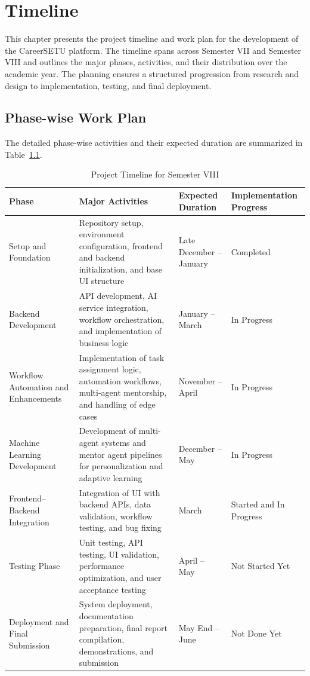 \documentclass[12pt,a4paper]{report}
\begin{document}
\chapter{Timeline}

This chapter presents the project timeline and work plan for the development of the
CareerSETU platform. The timeline spans across Semester VII and Semester VIII and
outlines the major phases, activities, and their distribution over the academic year. The
planning ensures a structured progression from research and design to implementation,
testing, and final deployment.




\section{Phase-wise Work Plan}

The detailed phase-wise activities and their expected duration are summarized in
Table~\ref{tab:timeline_sem8}.

\begin{table}[H]
\centering
\caption{Project Timeline for Semester VIII}
\label{tab:timeline_sem8}
\begin{tabular}{|p{3.5cm}|p{6.5cm}|p{2.5cm}|p{2.5cm}|}
\hline
\textbf{Phase} & \textbf{Major Activities} & \textbf{Expected Duration} & \textbf{Implementation Progress} \\
\hline
Setup and Foundation &
Repository setup, environment configuration, frontend and backend initialization, and base UI structure &
Late December -- January &
Completed \\
\hline
Backend Development &
API development, AI service integration, workflow orchestration, and implementation of business logic &
January -- March &
In Progress \\
\hline
Workflow Automation and Enhancements &
Implementation of task assignment logic, automation workflows, multi-agent mentorship, and handling of edge cases &
November -- April &
In Progress \\
\hline
Machine Learning Development &
Development of multi-agent systems and mentor agent pipelines for personalization and adaptive learning &
December -- May &
In Progress \\
\hline
Frontend--Backend Integration &
Integration of UI with backend APIs, data validation, workflow testing, and bug fixing &
March &
Started and In Progress \\
\hline
Testing Phase &
Unit testing, API testing, UI validation, performance optimization, and user acceptance testing &
April -- May &
Not Started Yet \\
\hline
Deployment and Final Submission &
System deployment, documentation preparation, final report compilation, demonstrations, and submission &
May End -- June &
Not Done Yet \\
\hline
\end{tabular}
\end{table}
\end{document}

